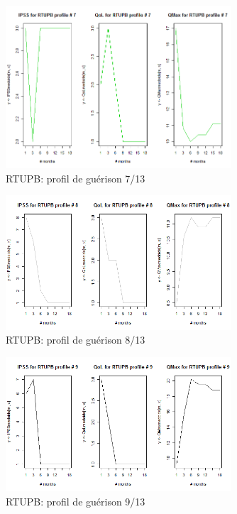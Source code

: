 \begin{figure}[H]
\centering
\includegraphics[width=0.75\textwidth]{../Fig/RTUPB/rtupb-profil-post-07.png}
\caption{RTUPB: profil de guérison 7/13}
\end{figure}

\begin{figure}[H]
\centering
\includegraphics[width=0.75\textwidth]{../Fig/RTUPB/rtupb-profil-post-08.png}
\caption{RTUPB: profil de guérison 8/13}
\end{figure}

\begin{figure}[H]
\centering
\includegraphics[width=0.75\textwidth]{../Fig/RTUPB/rtupb-profil-post-09.png}
\caption{RTUPB: profil de guérison 9/13}

\end{figure}

